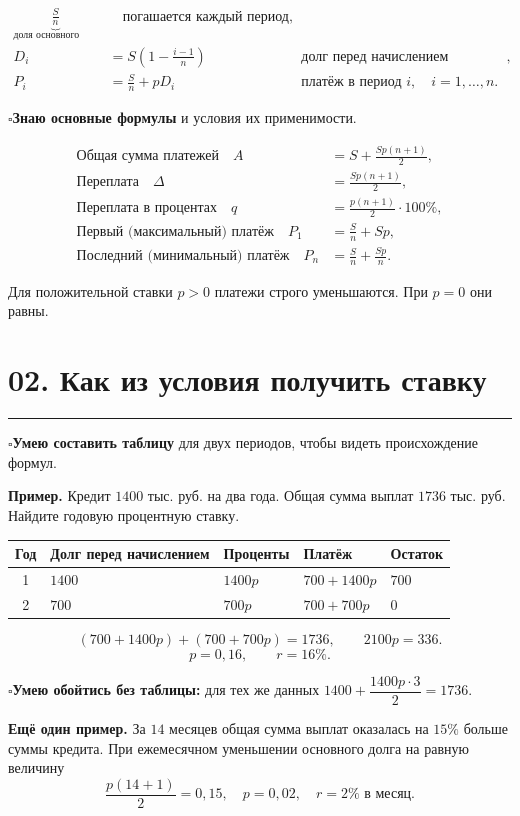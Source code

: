 \documentclass[a4paper,12pt]{article}
\newcommand{\sectionnote}[1]{{\small\color{softgray}#1\par}}
\newcommand{\criterion}[1]{\textcolor{darkaccent}{\bfseries #1}}
\newcommand{\checkitem}[1]{\par\noindent\hspace{-1pt}\textcolor{accent}{\(\square\)}\enspace #1\par}
\newcommand{\lessonsection}[1]{\Needspace{5\baselineskip}\section*{\color{darkaccent}#1}\vspace{-5pt}\noindent\textcolor{accent}{\rule{25mm}{0.7pt}}\par\vspace{1pt}}
\begin{document}
\begin{align*}
\underbrace{\frac Sn}_{\text{доля основного долга}}&\quad\text{погашается каждый период},\\
D_i&=S\left(1-\frac{i-1}{n}\right) &&\text{долг перед начислением процентов},\\
P_i&=\frac Sn+pD_i &&\text{платёж в период }i,\quad i=1,\ldots,n.
\end{align*}

\checkitem{\criterion{Знаю основные формулы} и условия их применимости.}
\begin{align*}
\text{Общая сумма платежей}\quad A&=S+\frac{Sp(n+1)}{2},\\
\text{Переплата}\quad \Delta&=\frac{Sp(n+1)}{2},\\
\text{Переплата в процентах}\quad q&=\frac{p(n+1)}{2}\cdot100\%,\\
\text{Первый (максимальный) платёж}\quad P_1&=\frac Sn+Sp,\\
\text{Последний (минимальный) платёж}\quad P_n&=\frac Sn+\frac{Sp}{n}.
\end{align*}
\sectionnote{Для положительной ставки \(p>0\) платежи строго уменьшаются. При \(p=0\) они равны.}

\clearpage
\lessonsection{02. Как из условия получить ставку}
\checkitem{\criterion{Умею составить таблицу} для двух периодов, чтобы видеть происхождение формул.}

\textbf{Пример.} Кредит \(1400\) тыс. руб. на два года. Общая сумма выплат \(1736\) тыс. руб. Найдите годовую процентную ставку.

\renewcommand{\arraystretch}{1.24}
\begin{center}
\small
\begin{tabularx}{\linewidth}{@{}cXXXX@{}}
\toprule
Год & Долг перед начислением & Проценты & Платёж & Остаток \\
\midrule
1 & \(1400\) & \(1400p\) & \(700+1400p\) & \(700\) \\
2 & \(700\) & \(700p\) & \(700+700p\) & \(0\) \\
\bottomrule
\end{tabularx}
\end{center}
\[
(700+1400p)+(700+700p)=1736,\qquad
2100p=336.
\]
\[
p=0{,}16,\qquad \boxed{r=16\%}.
\]
\checkitem{\criterion{Умею обойтись без таблицы:} для тех же данных \(1400+\dfrac{1400p\cdot3}{2}=1736\).}

\textbf{Ещё один пример.} За \(14\) месяцев общая сумма выплат оказалась на \(15\%\) больше суммы кредита. При ежемесячном уменьшении основного долга на равную величину
\[
\frac{p(14+1)}2=0{,}15,\quad p=0{,}02,\quad \boxed{r=2\%\text{ в месяц}}.
\]
\end{document}
